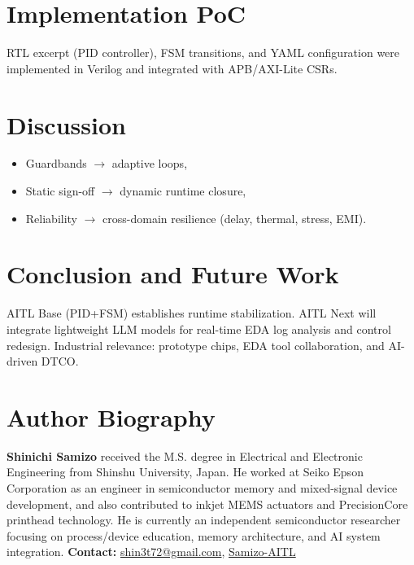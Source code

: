 \documentclass[conference]{IEEEtran}
\begin{document}
\section{Implementation PoC}
RTL excerpt (PID controller), FSM transitions, and YAML configuration were implemented in Verilog and integrated with APB/AXI-Lite CSRs.

\section{Discussion}
\begin{itemize}
  \item Guardbands $\to$ adaptive loops,
  \item Static sign-off $\to$ dynamic runtime closure,
  \item Reliability $\to$ cross-domain resilience (delay, thermal, stress, EMI).
\end{itemize}

\section{Conclusion and Future Work}
AITL Base (PID+FSM) establishes runtime stabilization.  
AITL Next will integrate lightweight LLM models for real-time EDA log analysis and control redesign.  
Industrial relevance: prototype chips, EDA tool collaboration, and AI-driven DTCO.




\section*{Author Biography}
\noindent\textbf{Shinichi Samizo}
received the M.S. degree in Electrical and Electronic Engineering from Shinshu University, Japan.  
He worked at Seiko Epson Corporation as an engineer in semiconductor memory and mixed-signal device development, and also contributed to inkjet MEMS actuators and PrecisionCore printhead technology.  
He is currently an independent semiconductor researcher focusing on process/device education, memory architecture, and AI system integration.  
\textbf{Contact:} \href{mailto:shin3t72@gmail.com}{shin3t72@gmail.com}, \href{https://github.com/Samizo-AITL}{Samizo-AITL}
\end{document}
